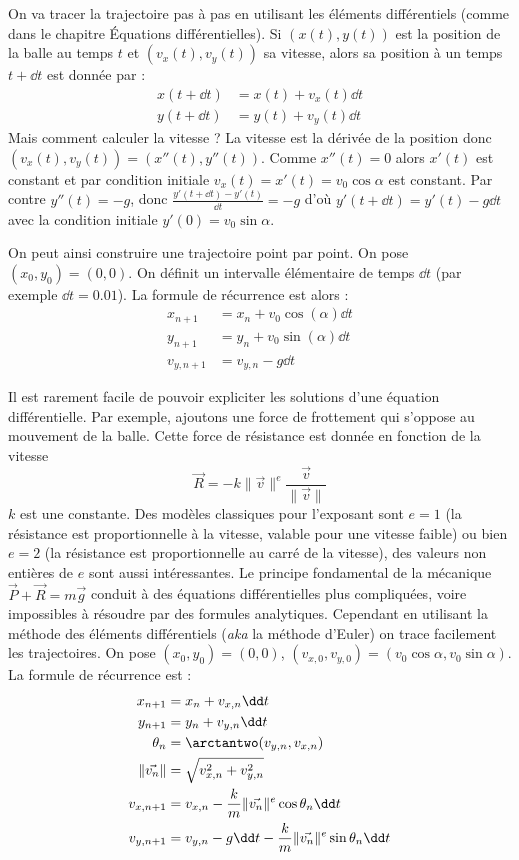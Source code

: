 \documentclass[11pt,class=report,crop=false]{standalone}
\begin{document}
 On va tracer la trajectoire pas à pas en utilisant les éléments différentiels (comme dans le chapitre \og{}Équations différentielles\fg). Si $(x(t) , y(t))$ est la position de la balle au temps $t$ et $(v_x(t), v_y(t))$ sa vitesse, alors sa position à un temps $t + \dd t$ est donnée par :
\begin{align*}
    x(t + \dd t) &= x(t) + v_x(t) \dd t \\
    y(t + \dd t) &= y(t) + v_y(t) \dd t
\end{align*}
Mais comment calculer la vitesse ? La vitesse est la dérivée de la position donc $(v_x(t), v_y(t)) = (x''(t), y''(t))$.
Comme $x''(t)=0$ alors $x'(t)$ est constant et par condition initiale $v_x(t) = x'(t) = v_0 \cos \alpha$ est constant.
Par contre $y''(t) = -g$, donc $\frac{y'(t + \dd t) - y'(t)}{\dd t} = -g$ d'où $y'(t + \dd t) = y'(t) - g \dd t$ avec la condition initiale $y'(0) = v_0 \sin \alpha$.

On peut ainsi construire une trajectoire point par point.
On pose $(x_0, y_0) = (0, 0)$. On définit un intervalle élémentaire de temps $\dd t$ (par exemple $\dd t = 0.01$).  La formule de récurrence est alors :
\begin{align*}
    x_{n+1} &= x_n + v_0  \cos(\alpha) \dd t \\
    y_{n+1} &= y_n + v_0 \sin(\alpha) \dd t \\
    v_{y,n+1} &= v_{y,n} - g \dd t
\end{align*}

\bigskip

Il est rarement facile de  pouvoir expliciter les solutions d'une équation différentielle. Par exemple, ajoutons une force de frottement qui s'oppose au mouvement de la balle. Cette force de résistance est donnée en fonction de la vitesse
$$\vec R = -k \| \vec v\| ^{e} \frac{\vec v}{\| \vec v \|}$$
$k$ est une constante. Des modèles classiques pour l'exposant sont $e=1$ (la résistance est proportionnelle à la vitesse, valable pour une vitesse faible) ou bien $e=2$ (la résistance est proportionnelle au carré de la vitesse), des valeurs non entières de $e$ sont aussi intéressantes.
Le principe fondamental de la mécanique $\vec P + \vec R = m\vec g$ conduit à des équations différentielles plus compliquées, voire impossibles à résoudre par des formules analytiques. Cependant en utilisant la méthode des éléments différentiels (\emph{aka} la méthode d'Euler) on trace facilement les trajectoires.
On pose $(x_0, y_0) = (0, 0)$, $(v_{x,0}, v_{y,0}) = (v_0 \cos \alpha, v_0 \sin \alpha)$.
La formule de récurrence est : 
\begin{align*}
	x_{n+1} &= x_n + v_{x,n} \dd t \\
	y_{n+1} &= y_n + v_{y,n} \dd t \\
	\theta_n &= \arctantwo(v_{y,n},v_{x,n}) \\ 
	\| \vec{v_n} \| &= \sqrt{v_{x,n}^2 + v_{y,n}^2} \\
	v_{x,n+1} &= v_{x,n} - \frac{k}{m} 	\| \vec{v_n} \|^e \cos \theta_n \dd t \\     
	v_{y,n+1} &= v_{y,n} - g \dd t - \frac{k}{m} \| \vec{v_n} \|^e \sin \theta_n \dd t \\
\end{align*}
\end{document}
